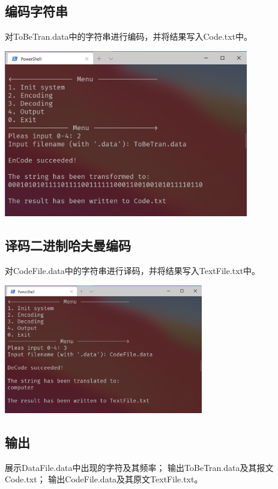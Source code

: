 \documentclass{ctexart}
\begin{document}
    \subsection{编码字符串}
    对ToBeTran.data中的字符串进行编码，并将结果写入Code.txt中。
    \begin{center}
        \includegraphics[width=0.8\textwidth]{测试4.png}
    \end{center}

    \subsection{译码二进制哈夫曼编码}
    对CodeFile.data中的字符串进行译码，并将结果写入TextFile.txt中。
    \begin{center}
        \includegraphics[width=0.65\textwidth]{测试5.png}
    \end{center}

    \subsection{输出}
    展示DataFile.data中出现的字符及其频率；
    输出ToBeTran.data及其报文Code.txt；
    输出CodeFile.data及其原文TextFile.txt。
\end{document}

